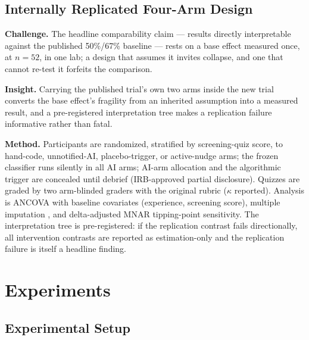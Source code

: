 \documentclass[11pt]{article}
\begin{document}
\subsection{Internally Replicated Four-Arm Design}

\textbf{Challenge.} The headline comparability claim --- results directly interpretable against the published 50\%/67\% baseline --- rests on a base effect measured once, at $n = 52$, in one lab; a design that assumes it invites collapse, and one that cannot re-test it forfeits the comparison.

\textbf{Insight.} Carrying the published trial's own two arms inside the new trial converts the base effect's fragility from an inherited assumption into a measured result, and a pre-registered interpretation tree makes a replication failure informative rather than fatal.

\textbf{Method.} Participants are randomized, stratified by screening-quiz score, to hand-code, unnotified-AI, placebo-trigger, or active-nudge arms; the frozen classifier runs silently in all AI arms; AI-arm allocation and the algorithmic trigger are concealed until debrief (IRB-approved partial disclosure). Quizzes are graded by two arm-blinded graders with the original rubric ($\kappa$ reported). Analysis is ANCOVA with baseline covariates (experience, screening score), multiple imputation \citep[50 datasets, Rubin's rules;][]{rubin1987multiple}, and delta-adjusted MNAR tipping-point sensitivity. The interpretation tree is pre-registered: if the replication contrast fails directionally, all intervention contrasts are reported as estimation-only and the replication failure is itself a headline finding.

\section{Experiments}
\label{sec:experiments}

\subsection{Experimental Setup}
\end{document}
